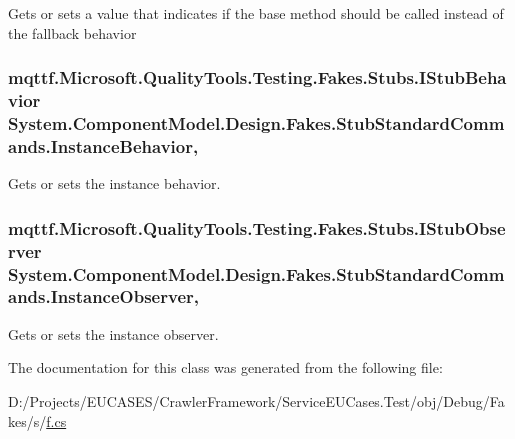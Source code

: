 Gets or sets a value that indicates if the base method should be called instead of the fallback behavior

\hypertarget{class_system_1_1_component_model_1_1_design_1_1_fakes_1_1_stub_standard_commands_a468748554896f31955ba87cd439edca0}{
\subsubsection[{Instance\-Behavior}]{\setlength{\rightskip}{0pt plus 5cm}mqttf.\-Microsoft.\-Quality\-Tools.\-Testing.\-Fakes.\-Stubs.\-I\-Stub\-Behavior System.\-Component\-Model.\-Design.\-Fakes.\-Stub\-Standard\-Commands.\-Instance\-Behavior\hspace{0.3cm}{\ttfamily [get]}, {\ttfamily [set]}}}\label{class_system_1_1_component_model_1_1_design_1_1_fakes_1_1_stub_standard_commands_a468748554896f31955ba87cd439edca0}


Gets or sets the instance behavior.

\hypertarget{class_system_1_1_component_model_1_1_design_1_1_fakes_1_1_stub_standard_commands_aaf76fa3f57af8e7f663581bc34ac96e6}{
\subsubsection[{Instance\-Observer}]{\setlength{\rightskip}{0pt plus 5cm}mqttf.\-Microsoft.\-Quality\-Tools.\-Testing.\-Fakes.\-Stubs.\-I\-Stub\-Observer System.\-Component\-Model.\-Design.\-Fakes.\-Stub\-Standard\-Commands.\-Instance\-Observer\hspace{0.3cm}{\ttfamily [get]}, {\ttfamily [set]}}}\label{class_system_1_1_component_model_1_1_design_1_1_fakes_1_1_stub_standard_commands_aaf76fa3f57af8e7f663581bc34ac96e6}


Gets or sets the instance observer.



The documentation for this class was generated from the following file\-:\begin{DoxyCompactItemize}
\item 
D\-:/\-Projects/\-E\-U\-C\-A\-S\-E\-S/\-Crawler\-Framework/\-Service\-E\-U\-Cases.\-Test/obj/\-Debug/\-Fakes/s/\hyperlink{s_2f_8cs}{f.\-cs}\end{DoxyCompactItemize}
